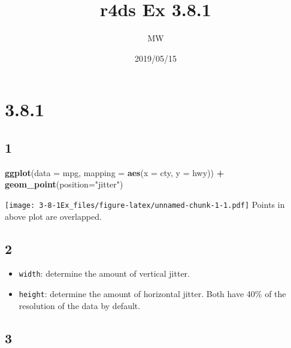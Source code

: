 \documentclass[]{article}
\title{r4ds Ex 3.8.1}
\author{MW}
\date{2019/05/15}
\newenvironment{Shaded}{\begin{snugshade}}{\end{snugshade}}
\newcommand{\DataTypeTok}[1]{\textcolor[rgb]{0.13,0.29,0.53}{#1}}
\newcommand{\KeywordTok}[1]{\textcolor[rgb]{0.13,0.29,0.53}{\textbf{#1}}}
\newcommand{\NormalTok}[1]{#1}
\newcommand{\OperatorTok}[1]{\textcolor[rgb]{0.81,0.36,0.00}{\textbf{#1}}}
\newcommand{\StringTok}[1]{\textcolor[rgb]{0.31,0.60,0.02}{#1}}
\providecommand{\tightlist}{%
  \setlength{\itemsep}{0pt}\setlength{\parskip}{0pt}}
\begin{document}
\maketitle

\hypertarget{section}{%
\section{3.8.1}\label{section}}

\hypertarget{section-1}{%
\subsection{1}\label{section-1}}

\begin{Shaded}
\begin{Highlighting}[]
\KeywordTok{ggplot}\NormalTok{(}\DataTypeTok{data =}\NormalTok{ mpg, }\DataTypeTok{mapping =} \KeywordTok{aes}\NormalTok{(}\DataTypeTok{x =}\NormalTok{ cty, }\DataTypeTok{y =}\NormalTok{ hwy)) }\OperatorTok{+}\StringTok{ }
\StringTok{  }\KeywordTok{geom_point}\NormalTok{(}\DataTypeTok{position=}\StringTok{"jitter"}\NormalTok{)}
\end{Highlighting}
\end{Shaded}

\texttt{[image: 3-8-1Ex\_files/figure-latex/unnamed-chunk-1-1.pdf]}
Points in above plot are overlapped.

\hypertarget{section-2}{%
\subsection{2}\label{section-2}}

\begin{itemize}
\tightlist
\item
  \texttt{width}: determine the amount of vertical jitter.
\item
  \texttt{height}: determine the amount of horizontal jitter. Both have
  40\% of the resolution of the data by default.
\end{itemize}

\hypertarget{section-3}{%
\subsection{3}\label{section-3}}
\end{document}
